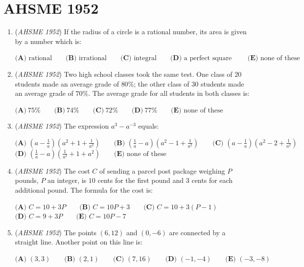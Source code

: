 \section{AHSME 1952}
        \begin{enumerate}
        	\item (\textit{AHSME 1952}) If the radius of a circle is a rational number, its area is given by a number which is:


 $\textbf{(A)\ } \text{rational}  \qquad \textbf{(B)\ } \text{irrational} \qquad \textbf{(C)\ } \text{integral} \qquad \textbf{(D)\ } \text{a perfect square }\qquad \textbf{(E)\ } \text{none of these}$


	\item (\textit{AHSME 1952}) Two high school classes took the same test. One class of $20$ students made an average grade of $80\%$; the other class of $30$ students made an average grade of $70\%$. The average grade for all students in both classes is:


 $\textbf{(A)}\ 75\%\qquad \textbf{(B)}\ 74\%\qquad \textbf{(C)}\ 72\%\qquad \textbf{(D)}\ 77\%\qquad \textbf{(E)\ }\text{none of these}$


	\item (\textit{AHSME 1952}) The expression $a^3-a^{-3}$ equals: 


 $\textbf{(A) \ }\left(a-\frac{1}{a}\right)\left(a^2+1+\frac{1}{a^2}\right) \qquad \textbf{(B) \ }\left(\frac{1}{a}-a\right)\left(a^2-1+\frac{1}{a^2}\right) \qquad \textbf{(C) \ }\left(a-\frac{1}{a}\right)\left(a^2-2+\frac{1}{a^2}\right) \qquad$
$\textbf{(D) \ }\left(\frac{1}{a}-a\right)\left(\frac{1}{a^2}+1+a^2\right) \qquad \textbf{(E) \ }\text{none of these}$


	\item (\textit{AHSME 1952}) The cost $C$ of sending a parcel post package weighing $P$ pounds, $P$ an integer, is $10$ cents for the first pound and $3$ cents for each additional pound. The formula for the cost is:


 $\textbf{(A) \ }C=10+3P \qquad \textbf{(B) \ }C=10P+3 \qquad \textbf{(C) \ }C=10+3(P-1) \qquad$
$\textbf{(D) \ }C=9+3P \qquad \textbf{(E) \ }C=10P-7$


	\item (\textit{AHSME 1952}) The points $(6,12)$ and $(0,-6)$ are connected by a straight line. Another point on this line is:


 $\textbf{(A) \ }(3,3)  \qquad \textbf{(B) \ }(2,1) \qquad \textbf{(C) \ }(7,16) \qquad \textbf{(D) \ }(-1,-4) \qquad \textbf{(E) \ }(-3,-8)$



\end{enumerate}

